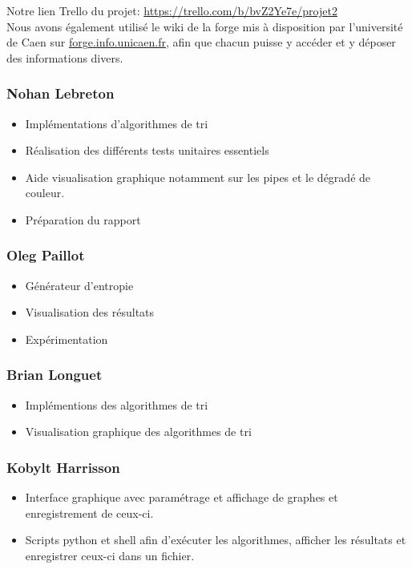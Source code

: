 \documentclass[10pt,a4paper]{article}
\begin{document}
        Notre lien Trello du projet: \href{https://trello.com/b/bvZ2Ye7e/projet2}{https://trello.com/b/bvZ2Ye7e/projet2}\\
        
        Nous avons également utilisé le wiki de la forge mis à disposition par l'université de Caen sur \href{https://forge.info.unicaen.fr}{forge.info.unicaen.fr}, afin que chacun puisse y accéder et y déposer des informations divers.
        
    \subsubsection{Nohan Lebreton}

       
                \begin{itemize}  
                    \item Implémentations d'algorithmes de tri
                    \item Réalisation des différents tests unitaires essentiels
                    \item Aide visualisation graphique notamment sur les pipes et le dégradé de couleur.
                    \item Préparation du rapport
                \end{itemize}
    
    \subsubsection{Oleg Paillot}
                \begin{itemize}  
                    \item Générateur d'entropie
                    \item Visualisation des résultats
                    \item Expérimentation
                \end{itemize}
    
    \subsubsection{Brian Longuet}
                \begin{itemize}  
                    \item Implémentions des algorithmes de tri
                    \item Visualisation graphique des algorithmes de tri
                \end{itemize}
    \subsubsection{Kobylt Harrisson}
                \begin{itemize}  
                    \item Interface graphique avec paramétrage et affichage de graphes et enregistrement de ceux-ci.
                    \item Scripts python et shell afin d'exécuter les algorithmes, afficher les résultats et enregistrer ceux-ci dans un fichier.
                \end{itemize}
\end{document}
